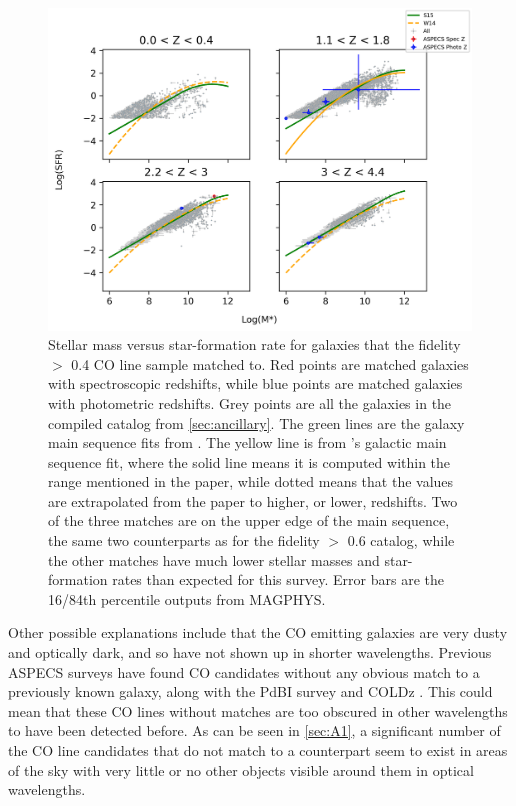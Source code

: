 \begin{figure}[!htbp]
\centering \includegraphics[width=120mm]{No_Cut_Mstar_vs_SFR_all_closest_sep_1_0_sn_fid_40.png}
\caption{Stellar mass versus star-formation rate for galaxies that the fidelity $>$ 0.4 CO line sample matched to. Red points are matched galaxies with spectroscopic redshifts, while blue points are matched galaxies with photometric redshifts. Grey points are all the galaxies in the compiled catalog from \ref{sec:ancillary}. The green lines are the galaxy main sequence fits from \cite{schreiber2015herschel}. The yellow line is from \cite{Whitaker_2014}'s galactic main sequence fit, where the solid line means it is computed within the range mentioned in the paper, while dotted means that the values are extrapolated from the paper to higher, or lower, redshifts. Two of the three matches are on the upper edge of the main sequence, the same two counterparts as for the fidelity $>$ 0.6 catalog, while the other matches have much lower stellar masses and star-formation rates than expected for this survey. Error bars are the 16/84th percentile outputs from MAGPHYS.}
\label{fig:fid_40_cross}
\end{figure}


Other possible explanations include that the CO emitting galaxies are very dusty and optically dark, and so have not shown up in shorter wavelengths. Previous ASPECS surveys have found CO candidates without any obvious match to a previously known galaxy, along with the PdBI survey and COLDz \cite{decarli2014molecular, pavesi2018co}. This could mean that these CO lines without matches are too obscured in other wavelengths to have been detected before. As can be seen in \ref{sec:A1}, a significant number of the CO line candidates that do not match to a counterpart seem to exist in areas of the sky with very little or no other objects visible around them in optical wavelengths. 

